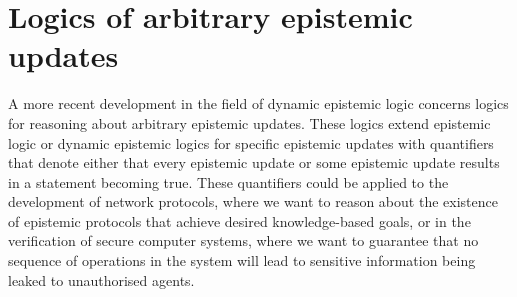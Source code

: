 
\section{Logics of arbitrary epistemic updates}

A more recent development in the field of dynamic epistemic logic concerns logics for reasoning about arbitrary epistemic updates.
These logics extend epistemic logic or dynamic epistemic logics for specific epistemic updates with quantifiers that denote either that every epistemic update or some epistemic update results in a statement becoming true.
These quantifiers could be applied to the development of network protocols, where we want to reason about the existence of epistemic protocols that achieve desired knowledge-based goals, or in the verification of secure computer systems, where we want to guarantee that no sequence of operations in the system will lead to sensitive information being leaked to unauthorised agents.

